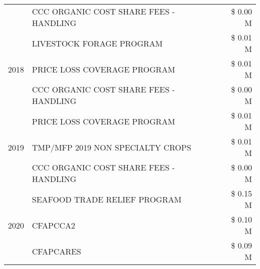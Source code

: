 \begin{tabular}{llr}
 & CCC ORGANIC COST SHARE FEES - HANDLING & \$ 0.00 M \\
\cline{1-3}
\multirow[t]{3}{*}{2018} & LIVESTOCK FORAGE PROGRAM & \$ 0.01 M \\
 & PRICE LOSS COVERAGE PROGRAM & \$ 0.01 M \\
 & CCC ORGANIC COST SHARE FEES - HANDLING & \$ 0.00 M \\
\cline{1-3}
\multirow[t]{3}{*}{2019} & PRICE LOSS COVERAGE PROGRAM & \$ 0.01 M \\
 & TMP/MFP 2019 NON SPECIALTY CROPS & \$ 0.01 M \\
 & CCC ORGANIC COST SHARE FEES - HANDLING & \$ 0.00 M \\
\cline{1-3}
\multirow[t]{3}{*}{2020} & SEAFOOD TRADE RELIEF PROGRAM & \$ 0.15 M \\
 & CFAPCCA2 & \$ 0.10 M \\
 & CFAPCARES & \$ 0.09 M \\
\cline{1-3}
\bottomrule
\end{tabular}

